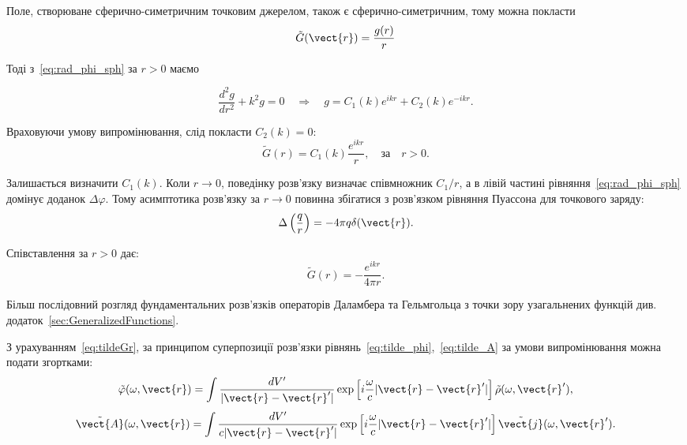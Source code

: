 Поле, створюване сферично-симетричним точковим джерелом, також є сферично-симетричним, тому можна покласти
\begin{equation*}
	\tilde{G} (\vect{r}) = \frac{g(r)}{r}
\end{equation*}

Тоді з~\eqref{eq:rad_phi_sph} за $r>0$ маємо

\begin{equation*}
	\frac{d^2 g}{dr^2} + k^2 g = 0 \quad \Rightarrow \quad g = C_1(k) e^{ikr} + C_2(k) e^{-ikr}.
\end{equation*}

Враховуючи умову випромінювання, слід покласти $C_2(k)=0$:
\begin{equation*}
	\tilde{G}(r) = C_1(k) \frac{e^{ikr}}{r}, \quad \text{за} \quad r>0.
\end{equation*}

Залишається визначити $C_1(k)$. Коли $r \to 0$, поведінку розв’язку визначає співмножник $C_1/r$, а в лівій частині рівняння~\eqref{eq:rad_phi_sph}
домінує доданок
$\Delta \varphi$. Тому асимптотика розв’язку за $r \to 0$ повинна збігатися з розв’язком рівняння Пуассона для точкового заряду:
\begin{equation}
	\Delta \left( \frac{q}{r} \right) = -4\pi q \delta (\vect{r}).
\end{equation}

Співставлення за $r > 0$ дає:
\begin{equation}\label{eq:tildeGr}
	\tilde{G}(r) = - \frac{e^{ikr}}{4\pi r}.
\end{equation}

Більш послідовний розгляд фундаментальних розв’язків операторів Даламбера та Гельмгольца з точки зору узагальнених функцій див. додаток~\ref{sec:GeneralizedFunctions}.

З урахуванням~\eqref{eq:tildeGr}, за принципом суперпозиції розв’язки рівнянь~\eqref{eq:tilde_phi},~\eqref{eq:tilde_A} за умови випромінювання можна
подати згортками:
\begin{equation}\label{eq:tilde_phi_bundle}
	\tilde{\varphi} (\omega, \vect{r}) = \int \frac{dV'}{|\vect{r} - \vect{r}'|} \exp \left[ i \frac{\omega}{c} |\vect{r} - \vect{r}'| \right]
	\tilde{\rho} (\omega, \vect{r}'),
\end{equation}
\begin{equation}\label{eq:tilde_A_bundle}
	\tilde{\vect{A}}(\omega, \vect{r}) = \int \frac{dV'}{c|\vect{r} - \vect{r}'|} \exp \left[ i \frac{\omega}{c} |\vect{r} - \vect{r}'| \right]
	\tilde{\vect{j}} (\omega, \vect{r}').
\end{equation}

